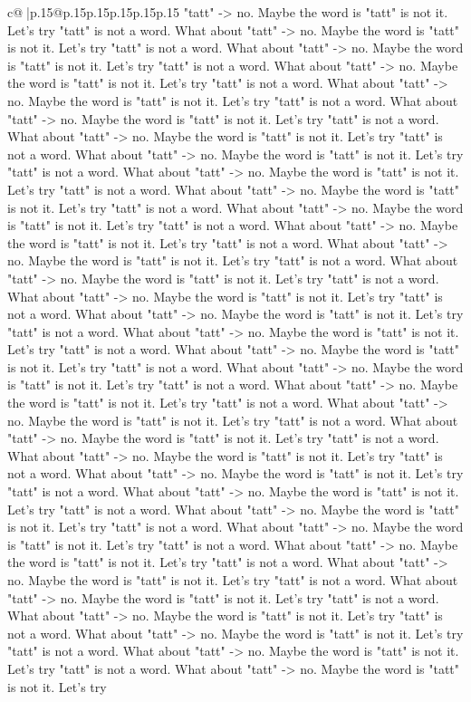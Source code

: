\documentclass{article}
\begin{document}
{\begin{supertabular}{c@{$\;$}|p{.15\linewidth}@{}p{.15\linewidth}p{.15\linewidth}p{.15\linewidth}p{.15\linewidth}p{.15\linewidth}}
{{{"tatt" {-}> no. Maybe the word is "tatt" is not it. Let's try "tatt" is not a word. What about "tatt" {-}> no. Maybe the word is "tatt" is not it. Let's try "tatt" is not a word. What about "tatt" {-}> no. Maybe the word is "tatt" is not it. Let's try "tatt" is not a word. What about "tatt" {-}> no. Maybe the word is "tatt" is not it. Let's try "tatt" is not a word. What about "tatt" {-}> no. Maybe the word is "tatt" is not it. Let's try "tatt" is not a word. What about "tatt" {-}> no. Maybe the word is "tatt" is not it. Let's try "tatt" is not a word. What about "tatt" {-}> no. Maybe the word is "tatt" is not it. Let's try "tatt" is not a word. What about "tatt" {-}> no. Maybe the word is "tatt" is not it. Let's try "tatt" is not a word. What about "tatt" {-}> no. Maybe the word is "tatt" is not it. Let's try "tatt" is not a word. What about "tatt" {-}> no. Maybe the word is "tatt" is not it. Let's try "tatt" is not a word. What about "tatt" {-}> no. Maybe the word is "tatt" is not it. Let's try "tatt" is not a word. What about "tatt" {-}> no. Maybe the word is "tatt" is not it. Let's try "tatt" is not a word. What about "tatt" {-}> no. Maybe the word is "tatt" is not it. Let's try "tatt" is not a word. What about "tatt" {-}> no. Maybe the word is "tatt" is not it. Let's try "tatt" is not a word. What about "tatt" {-}> no. Maybe the word is "tatt" is not it. Let's try "tatt" is not a word. What about "tatt" {-}> no. Maybe the word is "tatt" is not it. Let's try "tatt" is not a word. What about "tatt" {-}> no. Maybe the word is "tatt" is not it. Let's try "tatt" is not a word. What about "tatt" {-}> no. Maybe the word is "tatt" is not it. Let's try "tatt" is not a word. What about "tatt" {-}> no. Maybe the word is "tatt" is not it. Let's try "tatt" is not a word. What about "tatt" {-}> no. Maybe the word is "tatt" is not it. Let's try "tatt" is not a word. What about "tatt" {-}> no. Maybe the word is "tatt" is not it. Let's try "tatt" is not a word. What about "tatt" {-}> no. Maybe the word is "tatt" is not it. Let's try "tatt" is not a word. What about "tatt" {-}> no. Maybe the word is "tatt" is not it. Let's try "tatt" is not a word. What about "tatt" {-}> no. Maybe the word is "tatt" is not it. Let's try "tatt" is not a word. What about "tatt" {-}> no. Maybe the word is "tatt" is not it. Let's try "tatt" is not a word. What about "tatt" {-}> no. Maybe the word is "tatt" is not it. Let's try "tatt" is not a word. What about "tatt" {-}> no. Maybe the word is "tatt" is not it. Let's try "tatt" is not a word. What about "tatt" {-}> no. Maybe the word is "tatt" is not it. Let's try "tatt" is not a word. What about "tatt" {-}> no. Maybe the word is "tatt" is not it. Let's try "tatt" is not a word. What about "tatt" {-}> no. Maybe the word is "tatt" is not it. Let's try "tatt" is not a word. What about "tatt" {-}> no. Maybe the word is "tatt" is not it. Let's try "tatt" is not a word. What about "tatt" {-}> no. Maybe the word is "tatt" is not it. Let's try "tatt" is not a word. What about "tatt" {-}> no. Maybe the word is "tatt" is not it. Let's try "tatt" is not a word. What about "tatt" {-}> no. Maybe the word is "tatt" is not it. Let's try }}}
\end{supertabular}}
\end{document}
